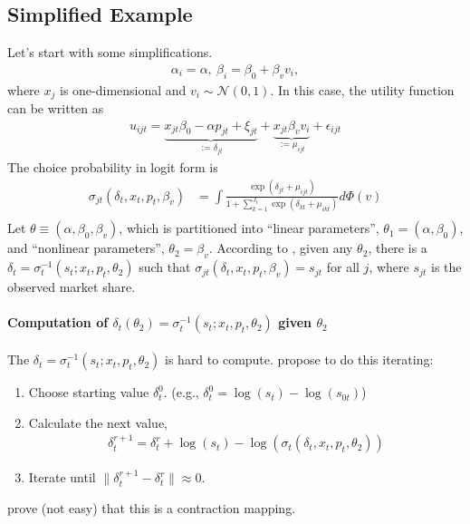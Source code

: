 \documentclass[11pt]{elegantbook}
\begin{document}
\subsection{Simplified Example}
Let's start with some simplifications.
\begin{equation}
    \begin{aligned}
        \alpha_i=\alpha,\ \beta_i=\beta_0+\beta_v v_i,
    \end{aligned}
    \nonumber
\end{equation}
where $x_j$ is one-dimensional and $v_i\sim \mathcal{N}(0,1)$. In this case, the utility function can be written as
\begin{equation}
    \begin{aligned}
        u_{ijt}=\underbrace{x_{jt}\beta_0-\alpha p_{jt}+\xi_{jt}}_{:=\delta_{jt}}+\underbrace{x_{jt}\beta_vv_i}_{:=\mu_{ijt}}+\epsilon_{ijt}
    \end{aligned}
    \nonumber
\end{equation}
The choice probability in logit form is
\begin{equation}
    \begin{aligned}
        \sigma_{jt}\left(\delta_t,x_t,p_t,\beta_v\right)&=\int \frac{\exp(\delta_{jt}+\mu_{ijt})}{1+\sum_{k=1}^{J_t}\exp(\delta_{kt}+\mu_{ikt})}d \Phi(v)\\
    \end{aligned}
    \nonumber
\end{equation}
Let $\theta\equiv(\alpha,\beta_0,\beta_v)$, which is partitioned into ``linear parameters'', $\theta_1=(\alpha,\beta_0)$, and ``nonlinear parameters'', $\theta_2=\beta_v$. According to \cite{berry1994estimating}, given any $\theta_2$, there is a $\delta_t=\sigma_{t}^{-1}\left(s_t; x_t,p_t,\theta_2\right)$ such that $\sigma_{jt}\left(\delta_t,x_t,p_t,\beta_v\right)=s_{jt}$ for all $j$, where $s_{jt}$ is the observed market share.

\paragraph*{Computation of $\delta_t(\theta_2)=\sigma_{t}^{-1}\left(s_t; x_t,p_t,\theta_2\right)$ given $\theta_2$}
The $\delta_t=\sigma_{t}^{-1}\left(s_t; x_t,p_t,\theta_2\right)$ is hard to compute. \cite{berry1995automobile} propose to do this iterating:
\begin{enumerate}
    \item Choose starting value $\delta_t^0$. (e.g., $\delta_t^0=\log(s_t)-\log(s_{0t})$)
    \item Calculate the next value,
    \begin{equation}
        \begin{aligned}
            \delta_t^{r+1}=\delta_t^r+\log\left(s_t\right)-\log\left(\sigma_{t}\left(\delta_t,x_t,p_t,\theta_2\right)\right)
        \end{aligned}
        \nonumber
    \end{equation}
    \item Iterate until $\|\delta_t^{r+1}-\delta_t^r\|\approx 0$.
\end{enumerate}
\cite{berry1995automobile} prove (not easy) that this is a contraction mapping.
\end{document}
